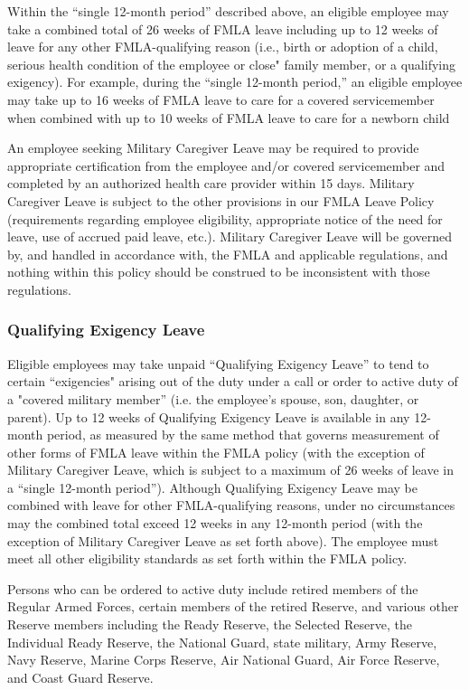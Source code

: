 \documentclass{book}
\begin{document}
Within the “single 12-month period” described above, an eligible employee may take a combined total of 26 weeks of FMLA leave including up to 12 weeks of leave for any other FMLA-qualifying reason (i.e., birth or adoption of a child, serious health condition of the employee or close" family member, or a qualifying exigency). For example, during the “single 12-month period,” an eligible employee may take up to 16 weeks of FMLA leave to care for a covered servicemember when combined with up to 10 weeks of FMLA leave to care for a newborn child

An employee seeking Military Caregiver Leave may be required to provide appropriate certification from the employee and/or covered servicemember and completed by an authorized health care provider within 15 days. Military Caregiver Leave is subject to the other provisions in our FMLA Leave Policy (requirements regarding employee eligibility, appropriate notice of the need for leave, use of accrued paid leave, etc.). Military Caregiver Leave will be governed by, and handled in accordance with, the FMLA and applicable regulations, and nothing within this policy should be construed to be inconsistent with those regulations.

\subsubsection{Qualifying Exigency Leave}

Eligible employees may take unpaid “Qualifying Exigency Leave” to tend to certain “exigencies" arising out of the duty under a call or order to active duty of a "covered military member” (i.e. the employee's spouse, son, daughter, or parent). Up to 12 weeks of Qualifying Exigency Leave is available in any 12-month period, as measured by the same method that governs measurement of other forms of FMLA leave within the FMLA policy (with the exception of Military Caregiver Leave, which is subject to a maximum of 26 weeks of leave in a “single 12-month period”). Although Qualifying Exigency Leave may be combined with leave for other FMLA-qualifying reasons, under no circumstances may the combined total exceed 12 weeks in any 12-month period (with the exception of Military Caregiver Leave as set forth above). The employee must meet all other eligibility standards as set forth within the FMLA policy.

Persons who can be ordered to active duty include retired members of the Regular Armed Forces, certain members of the retired Reserve, and various other Reserve members including the Ready Reserve, the Selected Reserve, the Individual Ready Reserve, the National Guard, state military, Army Reserve, Navy Reserve, Marine Corps Reserve, Air National Guard, Air Force Reserve, and Coast Guard Reserve.
\end{document}
